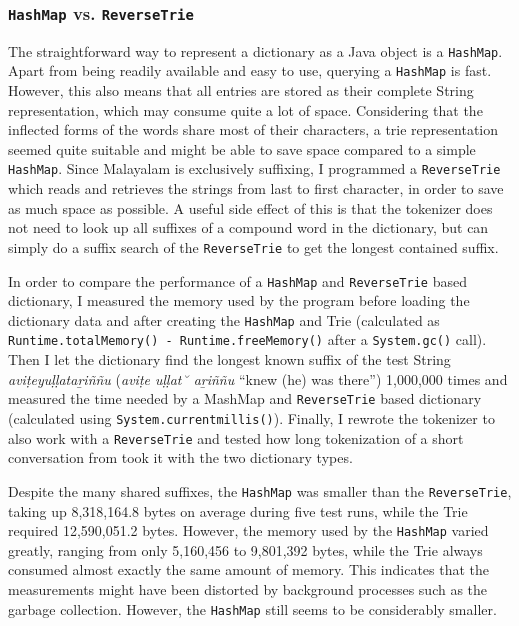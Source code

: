 \documentclass[a4paper]{article}
\newcommand{\typ}[1]{\texttt{#1}}
\begin{document}
\subsubsection*{\typ{HashMap} vs. \typ{ReverseTrie}}

The straightforward way to represent a dictionary as a Java object is a \typ{HashMap}. Apart from being readily available and easy to use, querying a \typ{HashMap} is fast. However, this also means that all entries are stored as their complete String representation, which may consume quite a lot of space. Considering that the inflected forms of the words share most of their characters, a trie representation seemed quite suitable and might be able to save space compared to a simple \typ{HashMap}. Since Malayalam is exclusively suffixing, I programmed a \typ{ReverseTrie} which reads and retrieves the strings from last to first character, in order to save as much space as possible. A useful side effect of this is that the tokenizer does not need to look up all suffixes of a compound word in the dictionary, but can simply do a suffix search of the \typ{ReverseTrie} to get the longest contained suffix.

In order to compare the performance of a \typ{HashMap} and \typ{ReverseTrie} based dictionary, I measured the memory used by the program before loading the dictionary data and after creating the \typ{HashMap} and Trie (calculated as \typ{Runtime.totalMemory() - Runtime.freeMemory()} after a \typ{System.gc()} call). Then I let the dictionary find the longest known suffix of the test String \textit{aviṭeyuḷḷataṟiññu} (\textit{aviṭe uḷḷat˘ aṟiññu} ``knew (he) was there'') 1,000,000 times and measured the time needed by a MashMap and \typ{ReverseTrie} based dictionary (calculated using \typ{System.currentmillis()}). Finally, I rewrote the tokenizer to also work with a \typ{ReverseTrie} and tested how long tokenization of a short conversation from \textcite{moag} took it with the two dictionary types.

Despite the many shared suffixes, the \typ{HashMap} was smaller than the \typ{ReverseTrie}, taking up 8,318,164.8 bytes on average during five test runs, while the Trie required 12,590,051.2 bytes. However, the memory used by the \typ{HashMap} varied greatly, ranging from only 5,160,456 to 9,801,392 bytes, while the Trie always consumed almost exactly the same amount of memory. This indicates that the measurements might have been distorted by background processes such as the garbage collection. However, the \typ{HashMap} still seems to be considerably smaller.
\end{document}
